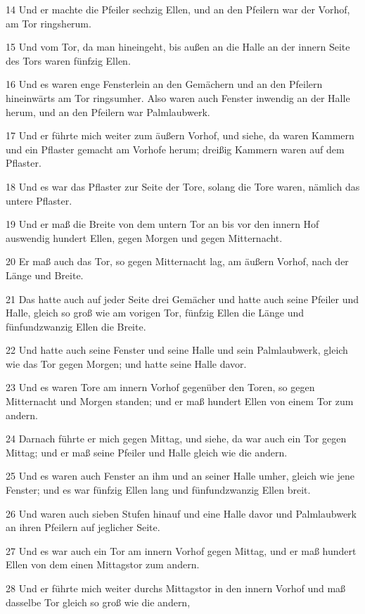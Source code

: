 \par 14 Und er machte die Pfeiler sechzig Ellen, und an den Pfeilern war der Vorhof, am Tor ringsherum.
\par 15 Und vom Tor, da man hineingeht, bis außen an die Halle an der innern Seite des Tors waren fünfzig Ellen.
\par 16 Und es waren enge Fensterlein an den Gemächern und an den Pfeilern hineinwärts am Tor ringsumher. Also waren auch Fenster inwendig an der Halle herum, und an den Pfeilern war Palmlaubwerk.
\par 17 Und er führte mich weiter zum äußern Vorhof, und siehe, da waren Kammern und ein Pflaster gemacht am Vorhofe herum; dreißig Kammern waren auf dem Pflaster.
\par 18 Und es war das Pflaster zur Seite der Tore, solang die Tore waren, nämlich das untere Pflaster.
\par 19 Und er maß die Breite von dem untern Tor an bis vor den innern Hof auswendig hundert Ellen, gegen Morgen und gegen Mitternacht.
\par 20 Er maß auch das Tor, so gegen Mitternacht lag, am äußern Vorhof, nach der Länge und Breite.
\par 21 Das hatte auch auf jeder Seite drei Gemächer und hatte auch seine Pfeiler und Halle, gleich so groß wie am vorigen Tor, fünfzig Ellen die Länge und fünfundzwanzig Ellen die Breite.
\par 22 Und hatte auch seine Fenster und seine Halle und sein Palmlaubwerk, gleich wie das Tor gegen Morgen; und hatte seine Halle davor.
\par 23 Und es waren Tore am innern Vorhof gegenüber den Toren, so gegen Mitternacht und Morgen standen; und er maß hundert Ellen von einem Tor zum andern.
\par 24 Darnach führte er mich gegen Mittag, und siehe, da war auch ein Tor gegen Mittag; und er maß seine Pfeiler und Halle gleich wie die andern.
\par 25 Und es waren auch Fenster an ihm und an seiner Halle umher, gleich wie jene Fenster; und es war fünfzig Ellen lang und fünfundzwanzig Ellen breit.
\par 26 Und waren auch sieben Stufen hinauf und eine Halle davor und Palmlaubwerk an ihren Pfeilern auf jeglicher Seite.
\par 27 Und es war auch ein Tor am innern Vorhof gegen Mittag, und er maß hundert Ellen von dem einen Mittagstor zum andern.
\par 28 Und er führte mich weiter durchs Mittagstor in den innern Vorhof und maß dasselbe Tor gleich so groß wie die andern,
